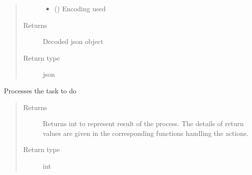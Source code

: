 \documentclass[letterpaper,10pt,english]{sphinxmanual}
\begin{document}
\begin{fulllineitems}
\begin{fulllineitems}
\begin{quote}
\begin{description}
\begin{itemize}
\item {} 
 () \textendash{} Encoding used

\end{itemize}

\item[{Returns}] \leavevmode
Decoded json object

\item[{Return type}] \leavevmode
json

\end{description}\end{quote}

\end{fulllineitems}


\begin{fulllineitems}
\label{\detokenize{Message:Message.Message.processTask}}
Processes the task to do
\begin{quote}\begin{description}
\item[{Returns}] \leavevmode
Returns int to represent result of the process. The details of return values are given in the corresponding functions handling the actions.

\item[{Return type}] \leavevmode
int

\end{description}\end{quote}

\end{fulllineitems}


\begin{fulllineitems}
\label{\detokenize{Message:Message.Message._send_msg}}
\end{fulllineitems}



\end{fulllineitems}
\end{document}
